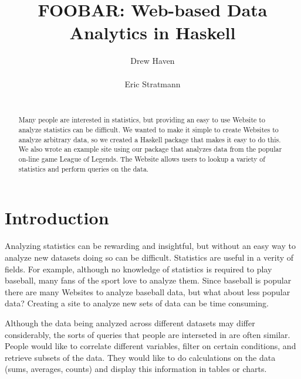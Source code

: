 \documentclass{chi2009}
\begin{document}
\setlength{\paperheight}{11in}
\setlength{\paperwidth}{8.5in}
\setlength{\pdfpageheight}{\paperheight}
\setlength{\pdfpagewidth}{\paperwidth}


\title{FOOBAR: Web-based Data Analytics in Haskell}
\author{
  \alignauthor Drew Haven\\
    \\
  \alignauthor Eric Stratmann\\
    \\
}

\maketitle

\begin{abstract}
Many people are interested in statistics, but providing an easy to use Website to analyze statistics can be difficult. We wanted to make it simple to create Websites to analyze arbitrary data, so we created a Haskell package that makes it easy to do this. We also wrote an example site using our package that analyzes data from the popular on-line game League of Legends. The Website allows users to lookup a variety of statistics and perform queries on the data.
\end{abstract}

\section{Introduction}

Analyzing statistics can be rewarding and insightful, but without an easy way to analyze new datasets doing so can be difficult. Statistics are useful in a verity of fields. For example, although no knowledge of statistics is required to play baseball, many fans of the sport love to analyze them. Since baseball is popular there are many Websites to analyze baseball data, but what about less popular data? Creating a site to analyze new sets of data can be time consuming.

Although the data being analyzed across different datasets may differ considerably, the sorts of queries that people are interseted in are often similar. People would like to correlate different variables, filter on certain conditions, and retrieve subsets of the data. They would like to do calculations on the data (sums, averages, counts) and display this information in tables or charts. 
\end{document}
